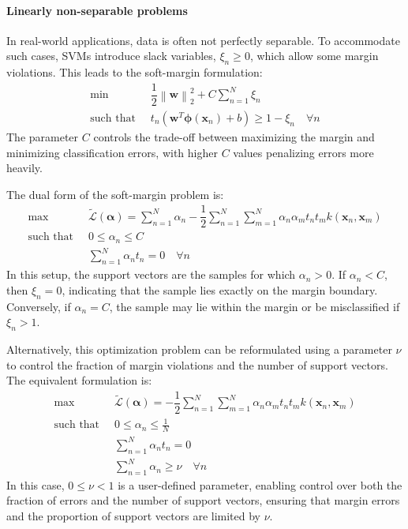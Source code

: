 \paragraph*{Linearly non-separable problems}
In real-world applications, data is often not perfectly separable. 
To accommodate such cases, SVMs introduce slack variables, $\xi_n \geq 0$, which allow some margin violations. 
This leads to the soft-margin formulation:
\begin{align*}
    \min                      \:&\: \dfrac{1}{2}{\left\lVert \mathbf{w} \right\rVert}_2^2+C\sum_{n=1}^{N}\xi_n         \\
    \text{such that }           &\: t_n\left(\mathbf{w}^T\boldsymbol{\phi}(\mathbf{x}_n)+b\right) \geq 1-\xi_n \quad \forall n       
\end{align*}  
The parameter $C$ controls the trade-off between maximizing the margin and minimizing classification errors, with higher $C$ values penalizing errors more heavily.

The dual form of the soft-margin problem is:
\begin{align*}
    \max                      \:&\: \tilde{\mathcal{L}}(\boldsymbol{\alpha})=\sum_{n=1}^{N}\alpha_n-\dfrac{1}{2}\sum_{n=1}^{N}\sum_{m=1}^N{\alpha_n \alpha_m t_n t_m k(\mathbf{x}_n, \mathbf{x}_m)}         \\
    \text{such that }           &\: 0 \leq \alpha_n \leq C \\
                                &\: \sum_{n=1}^{N}\alpha_n t_n = 0 \quad \forall n
\end{align*}  
In this setup, the support vectors are the samples for which $\alpha_n > 0$.
If $\alpha_n < C$, then $\xi_n = 0$, indicating that the sample lies exactly on the margin boundary.
Conversely, if $\alpha_n = C$, the sample may lie within the margin or be misclassified if $\xi_n > 1$.

Alternatively, this optimization problem can be reformulated using a parameter $\nu$ to control the fraction of margin violations and the number of support vectors.
The equivalent formulation is:
\begin{align*}
    \max                      \:&\: \tilde{\mathcal{L}}(\boldsymbol{\alpha})=-\dfrac{1}{2}\sum_{n=1}^{N}\sum_{m=1}^N{\alpha_n \alpha_m t_n t_m k(\mathbf{x}_n, \mathbf{x}_m)}         \\
    \text{such that }           &\: 0 \leq \alpha_n \leq \frac{1}{N} \\
                                &\: \sum_{n=1}^{N}\alpha_n t_n = 0 \\
                                &\: \sum_{n=1}^{N}\alpha_n\geq \nu \quad \forall n
\end{align*}  
In this case, $0\leq\nu<1$ is a user-defined parameter, enabling control over both the fraction of errors and the number of support vectors, ensuring that margin errors and the proportion of support vectors are limited by $\nu$. 

